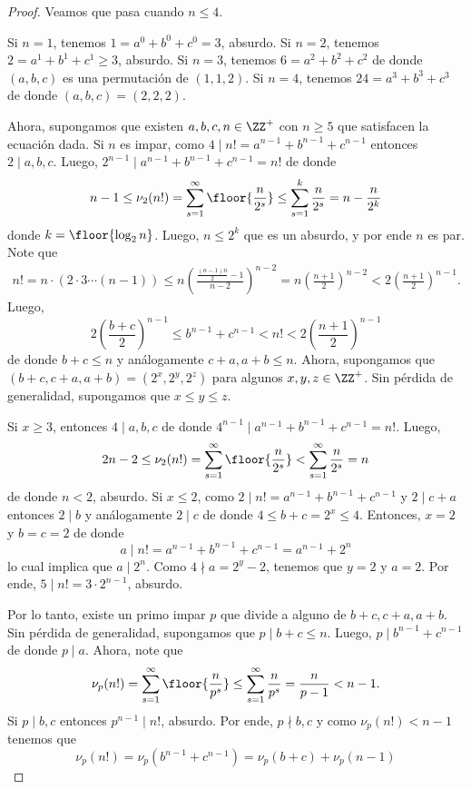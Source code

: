 \begin{proof}
	Veamos que pasa cuando $n\le 4$.
	\begin{itemize}
		\ii Si $n=1$, tenemos $1=a^0+b^0+c^0=3$, absurdo.
		\ii Si $n=2$, tenemos $2=a^1+b^1+c^1\ge 3$, absurdo.
		\ii Si $n=3$, tenemos $6=a^2+b^2+c^2$ de donde $(a,b,c)$ es una permutación de $(1,1,2)$.
		\ii Si $n=4$, tenemos $24=a^3+b^3+c^3$ de donde $(a,b,c)=(2,2,2)$.
	\end{itemize}
	Ahora, supongamos que existen $a,b,c,n\in\ZZ^+$ con $n\ge 5$ que satisfacen la ecuación dada. Si $n$ es impar, como $4\mid n!=a^{n-1}+b^{n-1}+c^{n-1}$ entonces $2\mid a,b,c$. Luego, $2^{n-1}\mid a^{n-1}+b^{n-1}+c^{n-1}=n!$ de donde
	\[n-1\le\nu_2(n!)=\sum_{s=1}^\infty\floor{\frac{n}{2^s}}\le\sum_{s=1}^k\frac{n}{2^s}=n-\frac{n}{2^k}\]
	donde $k=\floor{\log_2n}$. Luego, $n\le 2^k$ que es un absurdo, y por ende $n$ es par. Note que
	\begin{align*}
		n!=n\cdot(2\cdot 3\cdots(n-1))\le n\left(\frac{\frac{(n-1)n}{2}-1}{n-2}\right)^{n-2}=n\left(\frac{n+1}{2}\right)^{n-2}<2\left(\frac{n+1}{2}\right)^{n-1}.
	\end{align*}
	Luego,
	\[2\left(\frac{b+c}{2}\right)^{n-1}\le b^{n-1}+c^{n-1}<n!<2\left(\frac{n+1}{2}\right)^{n-1}\]
	de donde $b+c\le n$ y análogamente $c+a,a+b\le n$. Ahora, supongamos que $(b+c,c+a,a+b)=(2^x,2^y,2^z)$ para algunos $x,y,z\in\ZZ^+$. Sin pérdida de generalidad, supongamos que $x\le y\le z$.
	\begin{itemize}
		\ii Si $x\ge 3$, entonces $4\mid a,b,c$ de donde $4^{n-1}\mid a^{n-1}+b^{n-1}+c^{n-1}=n!$. Luego,
		\[2n-2\le\nu_2(n!)=\sum_{s=1}^\infty\floor{\frac{n}{2^s}}<\sum_{s=1}^\infty\frac{n}{2^s}=n\]
		de donde $n<2$, absurdo.
		\ii Si $x\le 2$, como $2\mid n!=a^{n-1}+b^{n-1}+c^{n-1}$ y $2\mid c+a$ entonces $2\mid b$ y análogamente $2\mid c$ de donde $4\le b+c=2^x\le 4$. Entonces, $x=2$ y $b=c=2$ de donde
		\[a\mid n!=a^{n-1}+b^{n-1}+c^{n-1}=a^{n-1}+2^n\]
		lo cual implica que $a\mid 2^n$. Como $4\nmid a=2^y-2$, tenemos que $y=2$ y $a=2$. Por ende, $5\mid n!=3\cdot 2^{n-1}$, absurdo.
	\end{itemize}
	Por lo tanto, existe un primo impar $p$ que divide a alguno de $b+c,c+a,a+b$. Sin pérdida de generalidad, supongamos que $p\mid b+c\le n$. Luego, $p\mid b^{n-1}+c^{n-1}$ de donde $p\mid a$. Ahora, note que
	\[\nu_p(n!)=\sum_{s=1}^\infty\floor{\frac{n}{p^s}}\le\sum_{s=1}^\infty\frac{n}{p^s}=\frac{n}{p-1}<n-1.\]
	Si $p\mid b,c$ entonces $p^{n-1}\mid n!$, absurdo. Por ende, $p\nmid b,c$ y como $\nu_p(n!)<n-1$ tenemos que
	\[\nu_p(n!)=\nu_p(b^{n-1}+c^{n-1})=\nu_p(b+c)+\nu_p(n-1)\]

\end{proof}
